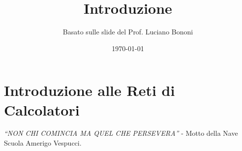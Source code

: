 


\title{Introduzione}
\author{Basato sulle slide del Prof. Luciano Bononi}
\date{\today}



\maketitle
\tableofcontents
\newpage

\section{Introduzione alle Reti di Calcolatori}

\textit{“NON CHI COMINCIA MA QUEL CHE PERSEVERA”} - Motto della Nave Scuola Amerigo Vespucci.

